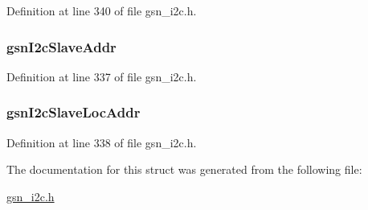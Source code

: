 Definition at line 340 of file gsn\_\-i2c.h.

\hypertarget{a00099_aa2b4613ed8c0e26e49720fc090b7efad}{
\subsubsection[{gsnI2cSlaveAddr}]{ {\bf gsnI2cSlaveAddr}}}
\label{a00099_aa2b4613ed8c0e26e49720fc090b7efad}


Definition at line 337 of file gsn\_\-i2c.h.

\hypertarget{a00099_a361e41e5d60cc3a794a3608bcb3f8efe}{
\subsubsection[{gsnI2cSlaveLocAddr}]{ {\bf gsnI2cSlaveLocAddr}}}
\label{a00099_a361e41e5d60cc3a794a3608bcb3f8efe}


Definition at line 338 of file gsn\_\-i2c.h.



The documentation for this struct was generated from the following file:\begin{DoxyCompactItemize}
\item 
\hyperlink{a00516}{gsn\_\-i2c.h}\end{DoxyCompactItemize}
